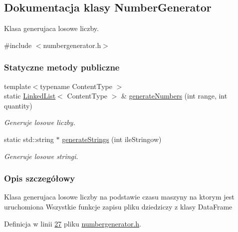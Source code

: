 \hypertarget{class_number_generator}{\subsection{Dokumentacja klasy Number\-Generator}
\label{class_number_generator}
}


Klasa generujaca losowe liczby.  




{\ttfamily \#include $<$numbergenerator.\-h$>$}

\subsubsection*{Statyczne metody publiczne}
\begin{DoxyCompactItemize}
\item 
{\footnotesize template$<$typename Content\-Type $>$ }\\static \hyperlink{class_linked_list}{Linked\-List}$<$ Content\-Type $>$ \& \hyperlink{class_number_generator_a4a31ee39c34c77b01f19516fd5253389}{generate\-Numbers} (int range, int quantity)
\begin{DoxyCompactList}\small\item\em Generuje losowe liczby. \end{DoxyCompactList}\item 
static std\-::string $\ast$ \hyperlink{class_number_generator_afed5ae8efb72655770753790714b7643}{generate\-Strings} (int ile\-Stringow)
\begin{DoxyCompactList}\small\item\em Generuje losowe stringi. \end{DoxyCompactList}\end{DoxyCompactItemize}


\subsubsection{Opis szczegółowy}
Klasa generujaca losowe liczby na podstawie czasu maszyny na ktorym jest uruchomiona Wszystkie funkcje zapisu pliku dziedziczy z klasy Data\-Frame 

Definicja w linii \hyperlink{numbergenerator_8h_source_l00027}{27} pliku \hyperlink{numbergenerator_8h_source}{numbergenerator.\-h}.



